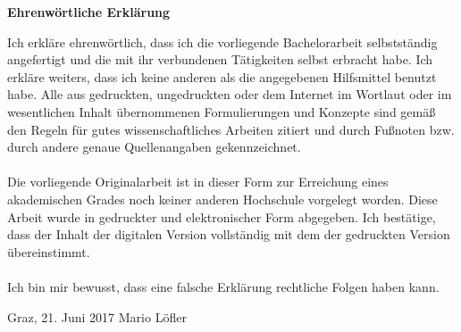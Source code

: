 \begin{titlepage}


\begin{center}\large\bf
Ehrenwörtliche Erklärung
\end{center}

Ich erkläre ehrenwörtlich, dass ich die vorliegende Bachelorarbeit
selbstständig angefertigt und die mit ihr verbundenen
Tätigkeiten selbst erbracht habe. Ich erkläre weiters, dass ich keine anderen
als die angegebenen Hilfsmittel benutzt habe. Alle aus gedruckten, ungedruckten
oder dem Internet im Wortlaut oder im wesentlichen Inhalt übernommenen
Formulierungen und Konzepte sind gemäß den Regeln für gutes
wissenschaftliches Arbeiten zitiert und durch Fußnoten bzw. durch andere genaue
Quellenangaben gekennzeichnet.\\\\
Die vorliegende Originalarbeit ist in dieser Form zur Erreichung eines akademischen
Grades noch keiner anderen Hochschule vorgelegt worden. Diese Arbeit
wurde in gedruckter und elektronischer Form abgegeben. Ich bestätige, dass
der Inhalt der digitalen Version vollständig mit dem der gedruckten Version
übereinstimmt.\\\\
Ich bin mir bewusst, dass eine falsche Erklärung rechtliche Folgen haben kann.

\vspace{50mm}
Graz, 21. Juni 2017 \hfill Mario Löfler

\end{titlepage}